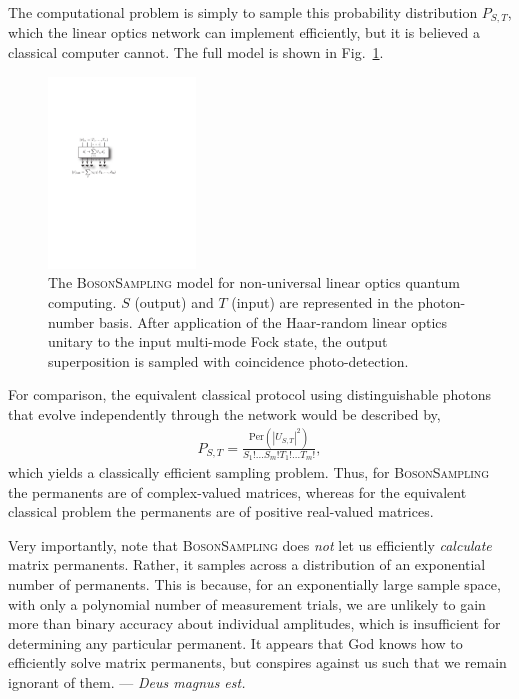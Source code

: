 The computational problem is simply to sample this probability distribution $P_{S,T}$, which the linear optics network can implement efficiently, but it is believed a classical computer cannot. The full model is shown in Fig.~\ref{fig:bs_model}.

\begin{figure}[!htbp]
\includegraphics[clip=true, width=0.35\textwidth]{bs_model}
\captionspacefig \caption{The \textsc{BosonSampling} model for non-universal linear optics quantum computing. $S$ (output) and $T$ (input) are represented in the photon-number basis. After application of the Haar-random linear optics unitary to the input multi-mode Fock state, the output superposition is sampled with coincidence photo-detection.} \label{fig:bs_model}
\end{figure}

For comparison, the equivalent classical protocol using distinguishable photons that evolve independently through the network would be described by,
\begin{align}
	P_{S,T} = \frac{\mathrm{Per}(|U_{S,T}|^2)}{S_1!\dots S_m! T_1!\dots T_m!},
\end{align}
which yields a classically efficient sampling problem. Thus, for \textsc{BosonSampling} the permanents are of complex-valued matrices, whereas for the equivalent classical problem the permanents are of positive real-valued matrices.

Very importantly, note that \textsc{BosonSampling} does \textit{not} let us efficiently \textit{calculate} matrix permanents. Rather, it samples across a distribution of an exponential number of permanents. This is because, for an exponentially large sample space, with only a polynomial number of measurement trials, we are unlikely to gain more than binary accuracy about individual amplitudes, which is insufficient for determining any particular permanent. It appears that God knows how to efficiently solve matrix permanents, but conspires against us such that we remain ignorant of them. --- \textit{Deus magnus est.}

